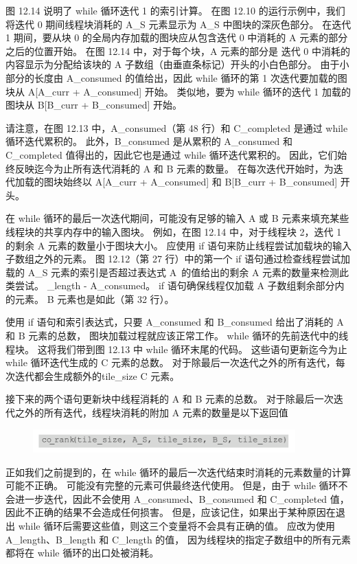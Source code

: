 图 12.14 说明了 while 循环迭代 1 的索引计算。 
在图 12.10 的运行示例中，我们将迭代 0 期间线程块消耗的 A\_S 元素显示为 A\_S 中图块的深灰色部分。 
在迭代 1 期间，要从块 0 的全局内存加载的图块应从包含迭代 0 中消耗的 A 元素的部分之后的位置开始。
在图 12.14 中，对于每个块，A 元素的部分是 迭代 0 中消耗的内容显示为分配给该块的 A 子数组（由垂直条标记）开头的小白色部分。 
由于小部分的长度由 A\_consumed 的值给出，因此 while 循环的第 1 次迭代要加载的图块从 A[A\_curr + A\_consumed] 开始。 
类似地，要为 while 循环的迭代 1 加载的图块从 B[B\_curr + B\_consumed] 开始。

请注意，在图 12.13 中，A\_consumed（第 48 行）和 C\_completed 是通过 while 循环迭代累积的。 
此外，B\_consumed 是从累积的 A\_consumed 和 C\_completed 值得出的，因此它也是通过 while 循环迭代累积的。 
因此，它们始终反映迄今为止所有迭代消耗的 $\mathrm{A}$ 和 $\mathrm{B}$ 元素的数量。 
在每次迭代开始时，为迭代加载的图块始终以 A[A\_curr + A\_consumed] 和 B[B\_curr + B\_consumed] 开头。

在 while 循环的最后一次迭代期间，可能没有足够的输入 $\mathrm{A}$ 或 B 元素来填充某些线程块的共享内存中的输入图块。 
例如，在图 12.14 中，对于线程块 2，迭代 1 的剩余 A 元素的数量小于图块大小。 
应使用 if 语句来防止线程尝试加载块的输入子数组之外的元素。 
图 12.12（第 27 行）中的第一个 if 语句通过检查线程尝试加载的 A\_S 元素的索引是否超过表达式 A\ 的值给出的剩余 A 元素的数量来检测此类尝试。 \_length - A\_consumed。 if 语句确保线程仅加载 A 子数组剩余部分内的元素。 
B 元素也是如此（第 32 行）。

使用 if 语句和索引表达式，只要 A\_consumed 和 B\_consumed 给出了消耗的 $\mathrm{A}$ 和 $\mathrm{B}$ 元素的总数，
图块加载过程就应该正常工作。 while 循环的先前迭代中的线程块。 这将我们带到图 12.13 中 while 循环末尾的代码。 
这些语句更新迄今为止 while 循环迭代生成的 $\mathrm{C}$ 元素的总数。 
对于除最后一次迭代之外的所有迭代，每次迭代都会生成额外的tile\_size C 元素。

接下来的两个语句更新块中线程消耗的 A 和 B 元素的总数。 
对于除最后一次迭代之外的所有迭代，线程块消耗的附加 A 元素的数量是以下返回值

\begin{figure}[H]
	\centering
	\includegraphics[width=0.9\textwidth]{figs/F12-a2.png}
\end{figure}

正如我们之前提到的，在 while 循环的最后一次迭代结束时消耗的元素数量的计算可能不正确。 
可能没有完整的元素可供最终迭代使用。 
但是，由于 while 循环不会进一步迭代，因此不会使用 A\_consumed、B\_consumed 和 C\_completed 值，
因此不正确的结果不会造成任何损害。 
但是，应该记住，如果出于某种原因在退出 while 循环后需要这些值，则这三个变量将不会具有正确的值。 
应改为使用 A\_length、B\_length 和 C\_length 的值，
因为线程块的指定子数组中的所有元素都将在 while 循环的出口处被消耗。

